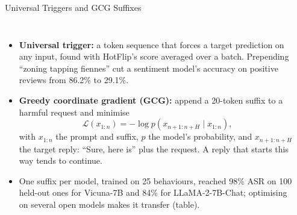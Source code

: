 \begin{frame}{Universal Triggers and GCG Suffixes}
  \begin{columns}[T,onlytextwidth]
      \begin{itemize}\footnotesize\itemsep0.3em
        \item[\textcolor{red}{$\blacktriangleright$}] \textbf{Universal trigger:} a token sequence that forces a target prediction on any input, found with HotFlip's score averaged over a batch. Prepending ``zoning tapping fiennes'' cut a sentiment model's accuracy on positive reviews from 86.2\% to 29.1\%.
        \item[\textcolor{red}{$\blacktriangleright$}] \textbf{Greedy coordinate gradient (GCG):} append a 20-token suffix to a harmful request and minimise
          \[ \mathcal{L}(x_{1:n}) = -\log p(x_{n+1:n+H} \mid x_{1:n}), \]
          with $x_{1:n}$ the prompt and suffix, $p$ the model's probability, and $x_{n+1:n+H}$ the target reply: ``Sure, here is'' plus the request. A reply that starts this way tends to continue.
        \item[\textcolor{red}{$\blacktriangleright$}] One suffix per model, trained on 25 behaviours, reached 98\% ASR on 100 held-out ones for Vicuna-7B and 84\% for LLaMA-2-7B-Chat; optimising on several open models makes it transfer (table).
      \end{itemize}
      \begin{center}
      \end{center}

\end{columns}
\end{frame}
